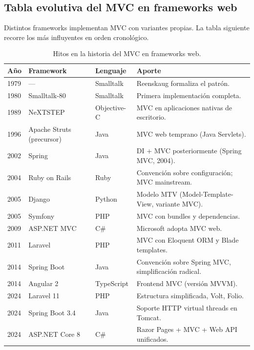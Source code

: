 \documentclass[11pt,a4paper,openany]{book}
\begin{document}
\subsection{Tabla evolutiva del MVC en frameworks web}

Distintos frameworks implementan MVC con variantes propias.
La tabla siguiente recorre los más influyentes en orden cronológico.


\begin{table}[htbp]
\centering
\caption{Hitos en la historia del MVC en frameworks web.}
\footnotesize
\begin{tabularx}{\textwidth}{lllX}
\toprule
\textbf{Año} & \textbf{Framework} & \textbf{Lenguaje} & \textbf{Aporte}\\
\midrule
1979 & ---           & Smalltalk & Reenskaug formaliza el patrón.\\
1980 & Smalltalk-80  & Smalltalk & Primera implementación completa.\\
1989 & NeXTSTEP      & Objective-C & MVC en aplicaciones nativas de escritorio.\\
1996 & Apache Struts (precursor) & Java & MVC web temprano (Java Servlets).\\
2002 & Spring        & Java & DI + MVC posteriormente (Spring MVC, 2004).\\
2004 & Ruby on Rails & Ruby & Convención sobre configuración; MVC mainstream.\\
2005 & Django        & Python & Modelo MTV (Model-Template-View, variante MVC).\\
2005 & Symfony       & PHP   & MVC con bundles y dependencias.\\
2009 & ASP.NET MVC   & C\#   & Microsoft adopta MVC web.\\
2011 & Laravel       & PHP   & MVC con Eloquent ORM y Blade templates.\\
2014 & Spring Boot   & Java  & Convención sobre Spring MVC, simplificación radical.\\
2014 & Angular 2     & TypeScript & Frontend MVC (versión MVVM).\\
2024 & Laravel 11    & PHP   & Estructura simplificada, Volt, Folio.\\
2024 & Spring Boot 3.4 & Java & Soporte HTTP virtual threads en Tomcat.\\
2024 & ASP.NET Core 8 & C\#  & Razor Pages + MVC + Web API unificados.\\
\bottomrule
\end{tabularx}
\end{table}
\end{document}
